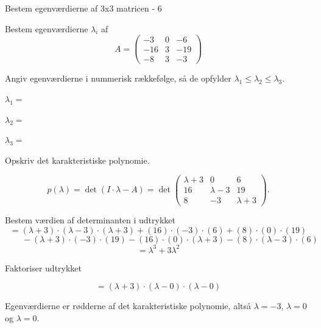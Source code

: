 \documentclass{article}
\begin{document}
\begin{exercise}{Bestem egenværdierne af 3x3 matricen - 6}

Bestem egenværdierne $\lambda_i$ af
\[
A=\begin{pmatrix}
-3 & 0 & -6 \\
-16 & 3 & -19 \\
-8 & 3 & -3
\end{pmatrix}
\]

Angiv egenværdierne i nummerisk rækkefølge, så de
opfylder $\lambda_1 \le \lambda_2 \le \lambda_3$.

$\lambda_1 = $ 

$\lambda_2 = $ 

$\lambda_3 = $ 

\hint
Opskriv det karakteristiske polynomie.

\hint
\[
p(\lambda)=\det\left(I \cdot \lambda - A \right)=\det\begin{pmatrix}
\lambda + 3 & 0 & 6 \\
16 & \lambda - 3 & 19 \\
8 & -3 & \lambda + 3
\end{pmatrix}.
\]

\hint
Bestem værdien af determinanten i udtrykket
\[
=(\lambda + 3) \cdot (\lambda - 3) \cdot (\lambda + 3)+(16) \cdot (-3) \cdot (6)+(8) \cdot (0) \cdot (19)
\]
\[
 \qquad -(\lambda + 3) \cdot (-3) \cdot (19)-(16) \cdot (0) \cdot (\lambda + 3)-(8) \cdot (\lambda - 3) \cdot (6)
\]
\[
=\lambda^3 + 3\lambda^2
\]

\hint
Faktoriser udtrykket

\hint
\[
=(\lambda + 3) \cdot (\lambda - 0) \cdot (\lambda - 0)
\]

\hint
Egenværdierne er rødderne af det karakteristiske polynomie,
altså
$\lambda=-3$, $\lambda=0$ og $\lambda=0$.

\end{exercise}
\end{document}

